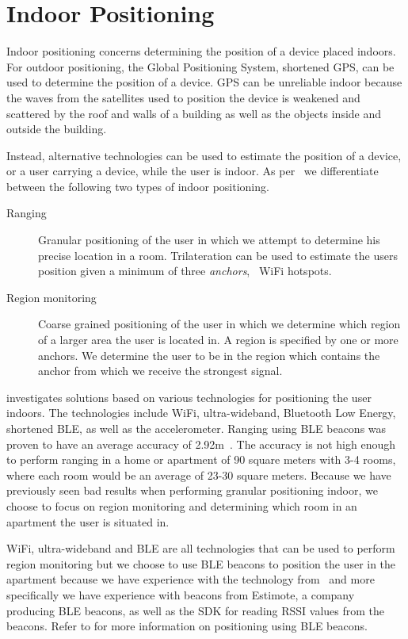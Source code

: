 \section{Indoor Positioning}
\label{sec:analysis:indoor-positioning}

Indoor positioning concerns determining the position of a device placed indoors. For outdoor positioning, the Global Positioning System, shortened GPS, can be used to determine the position of a device. GPS can be unreliable indoor because the waves from the satellites used to position the device is weakened and scattered by the roof and walls of a building as well as the objects inside and outside the building.

Instead, alternative technologies can be used to estimate the position of a device, or a user carrying a device, while the user is indoor. As per~\cite{prespecialisation} we differentiate between the following two types of indoor positioning.

\begin{description}
\item[Ranging] Granular positioning of the user in which we attempt to determine his precise location in a room. Trilateration can be used to estimate the users position given a minimum of three \emph{anchors}, \eg~WiFi hotspots.
\item[Region monitoring] Coarse grained positioning of the user in which we determine which region of a larger area the user is located in. A region is specified by one or more anchors. We determine the user to be in the region which contains the anchor from which we receive the strongest signal.
\end{description}

\cite{prespecialisation} investigates solutions based on various technologies for positioning the user indoors. The technologies include WiFi, ultra-wideband, Bluetooth Low Energy, shortened BLE, as well as the accelerometer. Ranging using BLE beacons was proven to have an average accuracy of 2.92m~\cite[p. 63]{prespecialisation}. The accuracy is not high enough to perform ranging in a home or apartment of 90 square meters with 3-4 rooms, where each room would be an average of 23-30 square meters. Because we have previously seen bad results when performing granular positioning indoor, we choose to focus on region monitoring and determining which room in an apartment the user is situated in.

WiFi, ultra-wideband and BLE are all technologies that can be used to perform region monitoring but we choose to use BLE beacons to position the user in the apartment because we have experience with the technology from~\cite{prespecialisation} and more specifically we have experience with beacons from Estimote, a company producing BLE beacons, as well as the SDK for reading RSSI values from the beacons. Refer to  for more information on positioning using BLE beacons.

